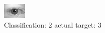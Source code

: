 \begin{figure}[h!]
\begin{center}
\includegraphics[width=0.60\columnwidth]{figures/ID570_class_2_target_3.png}
\end{center}
\caption{ Classification: 2 actual target: 3}
\label{fig:ID570_class_2_target_3}
\end{figure}
